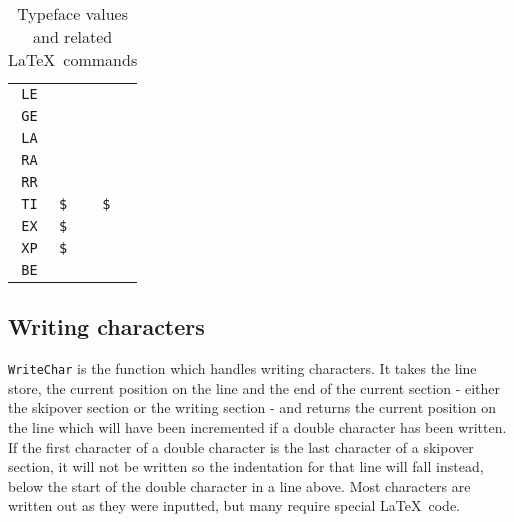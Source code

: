 \begin{table}
\begin{center}
\begin{tabular}{|c|l|l|}
{\tt LE} & & \\
{\tt GE} & & \\
{\tt LA} & & \\
{\tt RA} & & \\
{\tt RR} & & \\
{\tt TI} & {\tt \$ } & {\tt \$ } \\
{\tt EX} & {\tt \$ } & \\
{\tt XP} & {\tt \$ } & \\
{\tt BE} & & \\ \hline
\end{tabular}
\end{center}
\caption{Typeface values and related \LaTeX\ commands} \label{tf-comms}
\end{table}

\subsection{Writing characters}

{\tt WriteChar} is the function which handles writing characters.  It takes the line store,
the current position on the line and the end of the current section - either the skipover
section or the writing section - and returns the current position on the line which will
have been incremented if a double character has been written.  If the first character of
a double character is the last character of a skipover section, it will not be written
so the indentation for that line will fall instead, below the start of the double
character in a line above.  Most characters are written out as they were inputted,
but many require special \LaTeX\ code.

